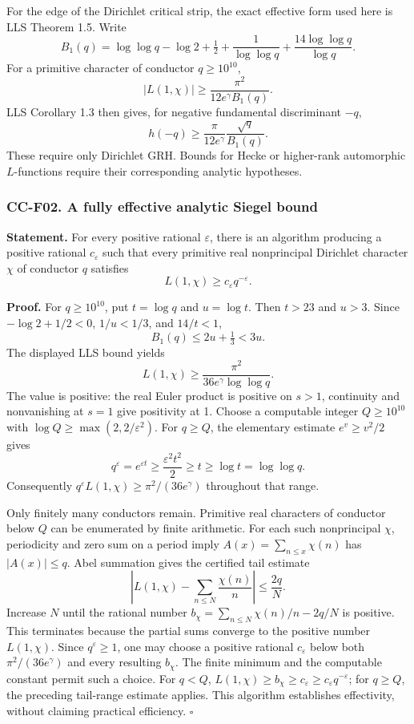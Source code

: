 For the edge of the Dirichlet critical strip, the exact effective form
used here is LLS Theorem 1.5. Write \[
 B_1(q)=\log\log q-\log2+\tfrac12+\frac1{\log\log q}
       +\frac{14\log\log q}{\log q}.
\] For a primitive character of conductor \(q\ge10^{10}\), \[
 |L(1,\chi)|\ge\frac{\pi^2}{12e^\gamma B_1(q)}.
\] LLS Corollary 1.3 then gives, for negative fundamental discriminant
\(-q\), \[
 h(-q)\ge\frac{\pi}{12e^\gamma}\frac{\sqrt q}{B_1(q)}.
\] These require only Dirichlet GRH. Bounds for Hecke or higher-rank
automorphic \(L\)-functions require their corresponding analytic
hypotheses.

\subsubsection{CC-F02. A fully effective analytic Siegel
bound}\label{cc-f02.-a-fully-effective-analytic-siegel-bound}

\textbf{Statement.} For every positive rational \(\varepsilon\), there
is an algorithm producing a positive rational \(c_\varepsilon\) such
that every primitive real nonprincipal Dirichlet character \(\chi\) of
conductor \(q\) satisfies \[
 L(1,\chi)\ge c_\varepsilon q^{-\varepsilon}.
\]

\textbf{Proof.} For \(q\ge10^{10}\), put \(t=\log q\) and \(u=\log t\).
Then \(t>23\) and \(u>3\). Since \(-\log2+1/2<0\), \(1/u<1/3\), and
\(14/t<1\), \[
 B_1(q)\le2u+\tfrac13<3u.
\] The displayed LLS bound yields \[
 L(1,\chi)\ge \frac{\pi^2}{36e^\gamma\log\log q}.
\] The value is positive: the real Euler product is positive on \(s>1\),
continuity and nonvanishing at \(s=1\) give positivity at 1. Choose a
computable integer \(Q\ge10^{10}\) with
\(\log Q\ge\max(2,2/\varepsilon^2)\). For \(q\ge Q\), the elementary
estimate \(e^v\ge v^2/2\) gives \[
 q^\varepsilon=e^{\varepsilon t}
 \ge\frac{\varepsilon^2t^2}{2}\ge t\ge\log t=\log\log q.
\] Consequently \(q^\varepsilon L(1,\chi)\ge\pi^2/(36e^\gamma)\)
throughout that range.

Only finitely many conductors remain. Primitive real characters of
conductor below \(Q\) can be enumerated by finite arithmetic. For each
such nonprincipal \(\chi\), periodicity and zero sum on a period imply
\(A(x)=\sum_{n\le x}\chi(n)\) has \(|A(x)|\le q\). Abel summation gives
the certified tail estimate \[
 \left|L(1,\chi)-\sum_{n\le N}\frac{\chi(n)}n\right|
 \le \frac{2q}{N}.
\] Increase \(N\) until the rational number
\(b_\chi=\sum_{n\le N}\chi(n)/n-2q/N\) is positive. This terminates
because the partial sums converge to the positive number \(L(1,\chi)\).
Since \(q^\varepsilon\ge1\), one may choose a positive rational
\(c_\varepsilon\) below both \(\pi^2/(36e^\gamma)\) and every resulting
\(b_\chi\). The finite minimum and the computable constant permit such a
choice. For \(q<Q\),
\(L(1,\chi)\ge b_\chi\ge c_\varepsilon\ge c_\varepsilon q^{-\varepsilon}\);
for \(q\ge Q\), the preceding tail-range estimate applies. This
algorithm establishes effectivity, without claiming practical
efficiency. \(\square\)

